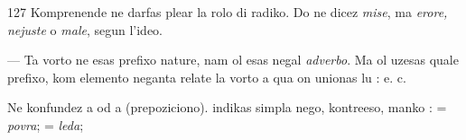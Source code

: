 \begin{VUpage}[131]{127}
Komprenende  ne darfas plear la rolo di radiko. Do\nl
ne dicez \textit{mise}, ma \textit{erore, nejuste} o \textit{male}, segun l'ideo.

 --- Ta vorto ne esas prefixo nature, nam ol esas negal\nl
\textit{adverbo}. Ma ol uzesas quale prefixo, kom elemento neganta\nl
relate la vorto a qua on unionas lu : \nl
{}\cc
{} e. c.

Ne konfundez  a  od a  (prepoziciono). \nl
indikas simpla nego,  kontreeso,  manko : \nl
{} = \textit{povra};  = \textit{leda}; \cc
\end{VUpage}

